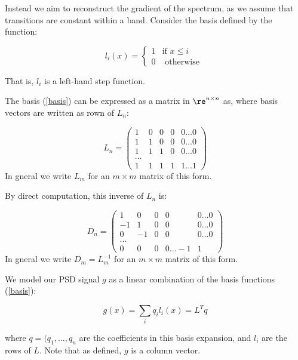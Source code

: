 Instead we aim to reconstruct the gradient of the spectrum, as we assume that transitions are constant within a band. Consider the basis defined by the function:

\begin{definition}
\begin{equation}
l_i\left(x\right) =
\begin{cases}
1 & \text{if } x \leq i \\
0 & \text{ otherwise } 
\end{cases}
\label{basis}
\end{equation}

That is, \(l_i\) is a left-hand step function. 

The basis (\ref{basis}) can be expressed as a matrix in \(\re^{n \times n}\) as, where basis vectors are written as rown of \(L_n\):

\begin{equation}
L_n = \begin{pmatrix}
 1 & 0 & 0 & 0  & 0 \ldots 0 \\
  1 & 1 & 0 & 0  & 0 \ldots 0\\
     1 & 1 & 1 & 0  & 0 \ldots0  \\
    \ldots  \\
     1 & 1 & 1 & 1  & 1 \ldots 1 
\end{pmatrix}
\end{equation}
In gneral we write \(L_m\) for an \(m \times m\) matrix of this form.
\end{definition}

\begin{lemma}
By direct computation, this inverse of \(L_n\) is:

\begin{equation}
D_n = \begin{pmatrix}
 1 & 0 & 0 & 0  & 0 \ldots 0 \\
  -1 & 1 & 0 & 0  & 0 \ldots 0\\
     0 & -1 & 0 & 0  & 0 \ldots0  \\
    \ldots  \\
     0 & 0 & 0 & 0  \ldots -1 & 1
\end{pmatrix}
\end{equation}
In gneral we write \(D_m = L_m^{-1}\) for an \(m \times m\) matrix of this form.
\end{lemma}

\begin{definition}
We model our PSD signal \(g\) as a linear combination of the basis functions (\ref{basis}):

\begin{equation}
g\left(x\right) = \sum_i q_i l_i\left(x\right) = L^Tq
\label{basis-expansion}
\end{equation}

where \(q = (q_1, \ldots, q_n\) are the coefficients in this basis expansion, and \(l_i\) are the rows of \(L\). Note that as defined, \(g\) is a column vector.
\end{definition}

